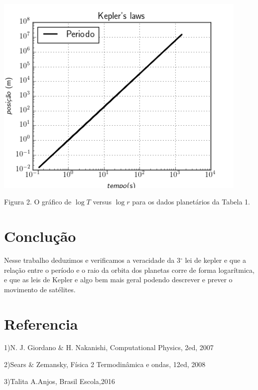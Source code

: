 \documentclass[a4paper]{article} %
\begin{document}
\begin{center}
	\includegraphics[width=4.80in,height=3.84in,keepaspectratio = false]{image1.png}
	
	\scriptsize Figura 2. O gráfico de $\log T$ versus $\log r$ para os dados planetários da Tabela 1.
	
\end{center}

\section{Conclu\c{c}\~ao}

Nesse trabalho deduzimos e verificamos a veracidade da 3$^\circ$ lei de kepler e que a relação entre o período e o raio da orbita dos planetas corre de forma logarítmica, e que as leis de Kepler e algo bem mais geral podendo descrever e prever o movimento de satélites.

\section{Referencia}

\noindent 

1)N. J. Giordano $\&$ H. Nakanishi, Computational Physics, 2ed, 2007

2)Sears $\&$ Zemansky, Física 2 Termodinâmica e ondas, 12ed, 2008

3)Talita A.Anjos, Brasil Escola,2016
\end{document}
